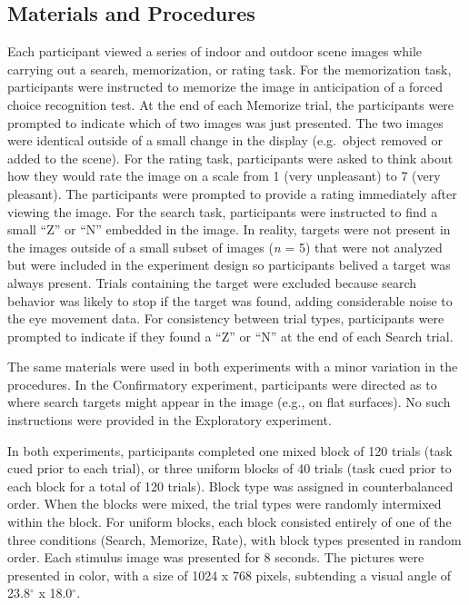 \documentclass[
  english,
  man, donotrepeattitle,floatsintext]{apa6}
\begin{document}
\subsection{Materials and Procedures}

Each participant viewed a series of indoor and outdoor scene images while carrying out a search, memorization, or rating task. For the memorization task, participants were instructed to memorize the image in anticipation of a forced choice recognition test. At the end of each Memorize trial, the participants were prompted to indicate which of two images was just presented. The two images were identical outside of a small change in the display (e.g.~object removed or added to the scene). For the rating task, participants were asked to think about how they would rate the image on a scale from 1 (very unpleasant) to 7 (very pleasant). The participants were prompted to provide a rating immediately after viewing the image. For the search task, participants were instructed to find a small \enquote{Z} or \enquote{N} embedded in the image. In reality, targets were not present in the images outside of a small subset of images (\emph{n} = 5) that were not analyzed but were included in the experiment design so participants belived a target was always present. Trials containing the target were excluded because search behavior was likely to stop if the target was found, adding considerable noise to the eye movement data. For consistency between trial types, participants were prompted to indicate if they found a \enquote{Z} or \enquote{N} at the end of each Search trial.

The same materials were used in both experiments with a minor variation in the procedures. In the Confirmatory experiment, participants were directed as to where search targets might appear in the image (e.g., on flat surfaces). No such instructions were provided in the Exploratory experiment.

In both experiments, participants completed one mixed block of 120 trials (task cued prior to each trial), or three uniform blocks of 40 trials (task cued prior to each block for a total of 120 trials). Block type was assigned in counterbalanced order. When the blocks were mixed, the trial types were randomly intermixed within the block. For uniform blocks, each block consisted entirely of one of the three conditions (Search, Memorize, Rate), with block types presented in random order. Each stimulus image was presented for 8 seconds. The pictures were presented in color, with a size of 1024 x 768 pixels, subtending a visual angle of 23.8\(^{\circ}\) x 18.0\(^{\circ}\).
\end{document}
